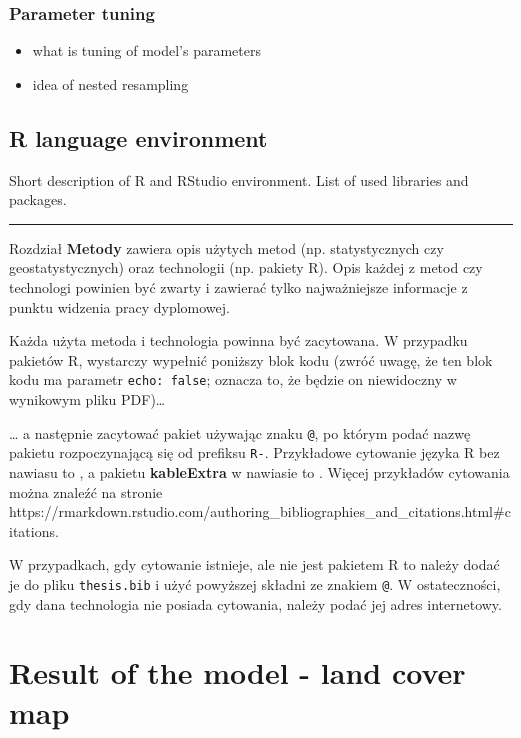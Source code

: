 \documentclass{amuthesis}
\begin{document}
\hypertarget{sec-tuning}{%
\subsection{Parameter tuning}\label{sec-tuning}}

\begin{itemize}
\item
  what is tuning of model's parameters
\item
  idea of nested resampling
\end{itemize}

\hypertarget{sec-r}{%
\section{R language environment}\label{sec-r}}

Short description of R and RStudio environment. List of used libraries
and packages.

\begin{center}\rule{0.5\linewidth}{0.5pt}\end{center}

Rozdział \textbf{Metody} zawiera opis użytych metod (np. statystycznych
czy geostatystycznych) oraz technologii (np. pakiety R). Opis każdej z
metod czy technologi powinien być zwarty i zawierać tylko najważniejsze
informacje z punktu widzenia pracy dyplomowej.

Każda użyta metoda i technologia powinna być zacytowana. W przypadku
pakietów R, wystarczy wypełnić poniższy blok kodu (zwróć uwagę, że ten
blok kodu ma parametr \texttt{echo:\ false}; oznacza to, że będzie on
niewidoczny w wynikowym pliku PDF)\ldots{}

\ldots{} a następnie zacytować pakiet używając znaku \texttt{@}, po
którym podać nazwę pakietu rozpoczynającą się od prefiksu \texttt{R-}.
Przykładowe cytowanie języka R bez nawiasu to \textcite{R-base}, a
pakietu \textbf{kableExtra} w nawiasie to \autocite{R-kableExtra}.
Więcej przykładów cytowania można znaleźć na stronie
https://rmarkdown.rstudio.com/authoring\_bibliographies\_and\_citations.html\#citations.

W przypadkach, gdy cytowanie istnieje, ale nie jest pakietem R to należy
dodać je do pliku \texttt{thesis.bib} i użyć powyższej składni ze
znakiem \texttt{@}. W ostateczności, gdy dana technologia nie posiada
cytowania, należy podać jej adres internetowy.


\hypertarget{sec-results-map}{%
\chapter{Result of the model - land cover map}\label{sec-results-map}}
\end{document}

